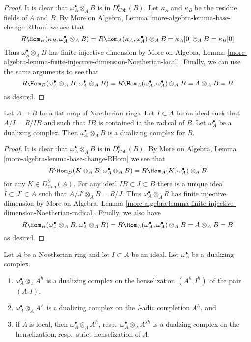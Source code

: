 \begin{proof}
It is clear that $\omega_A^\bullet \otimes_A B$ is in $D^b_{\textit{Coh}}(B)$.
Let $\kappa_A$ and $\kappa_B$ be the residue fields of $A$ and $B$.
By More on Algebra, Lemma \ref{more-algebra-lemma-base-change-RHom}
we see that
$$
R\Hom_B(\kappa_B, \omega_A^\bullet \otimes_A B) =
R\Hom_A(\kappa_A, \omega_A^\bullet) \otimes_A B =
\kappa_A[0] \otimes_A B = \kappa_B[0]
$$
Thus $\omega_A^\bullet \otimes_A B$ has finite injective dimension by
More on Algebra, Lemma
\ref{more-algebra-lemma-finite-injective-dimension-Noetherian-local}.
Finally, we can use the same arguments to see that
$$
R\Hom_B(\omega_A^\bullet \otimes_A B, \omega_A^\bullet \otimes_A B) =
R\Hom_A(\omega_A^\bullet, \omega_A^\bullet) \otimes_A B = A \otimes_A B = B
$$
as desired.
\end{proof}

\begin{lemma}
\label{lemma-flat-iso-mod-I}
Let $A \to B$ be a flat map of Noetherian rings. Let
$I \subset A$ be an ideal such that $A/I = B/IB$ and
such that $IB$ is contained in the radical of $B$.
Let $\omega_A^\bullet$ be a dualizing complex.
Then $\omega_A^\bullet \otimes_A B$ is a dualizing
complex for $B$.
\end{lemma}

\begin{proof}
It is clear that $\omega_A^\bullet \otimes_A B$ is in $D^b_{\textit{Coh}}(B)$.
By More on Algebra, Lemma \ref{more-algebra-lemma-base-change-RHom}
we see that
$$
R\Hom_B(K \otimes_A B, \omega_A^\bullet \otimes_A B) =
R\Hom_A(K, \omega_A^\bullet) \otimes_A B
$$
for any $K \in D^b_{\textit{Coh}}(A)$. For any ideal
$IB \subset J \subset B$ there is a unique ideal $I \subset J' \subset A$
such that $A/J' \otimes_A B = B/J$. Thus $\omega_A^\bullet \otimes_A B$
has finite injective dimension by
More on Algebra, Lemma
\ref{more-algebra-lemma-finite-injective-dimension-Noetherian-radical}.
Finally, we also have
$$
R\Hom_B(\omega_A^\bullet \otimes_A B, \omega_A^\bullet \otimes_A B) =
R\Hom_A(\omega_A^\bullet, \omega_A^\bullet) \otimes_A B = A \otimes_A B = B
$$
as desired.
\end{proof}

\begin{lemma}
\label{lemma-completion-henselization-dualizing}
Let $A$ be a Noetherian ring and let $I \subset A$ be an ideal.
Let $\omega_A^\bullet$ be a dualizing complex.
\begin{enumerate}
\item $\omega_A^\bullet \otimes_A A^h$ is a dualizing complex on the
henselization $(A^h, I^h)$ of the pair $(A, I)$,
\item $\omega_A^\bullet \otimes_A A^\wedge$ is a dualizing complex on
the $I$-adic completion $A^\wedge$, and
\item if $A$ is local, then $\omega_A^\bullet \otimes_A A^h$,
resp.\ $\omega_A^\bullet \otimes_A A^{sh}$ is a dualzing complex
on the henselization, resp.\ strict henselization of $A$.
\end{enumerate}
\end{lemma}

